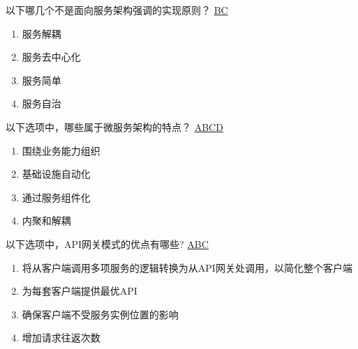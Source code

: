 \begin{problem}
	以下哪几个不是面向服务架构强调的实现原则？
	\uline{BC}    
    \vspace{-0.8em}
    \begin{multicols}{4}
        \begin{enumerate}[label=\Alph*.]
            \item 服务解耦
            \item 服务去中心化
            \item 服务简单
            \item 服务自治
        \end{enumerate}
    \end{multicols}
    \vspace{-1em}
\end{problem}



\begin{problem}
	‌以下选项中，哪些属于微服务架构的特点？
	\uline{ABCD}    
    \vspace{-0.8em}
    \begin{multicols}{4}
        \begin{enumerate}[label=\Alph*.]
            \item 围绕业务能力组织
            \item 基础设施自动化
            \item 通过服务组件化
            \item 内聚和解耦
        \end{enumerate}
    \end{multicols}
    \vspace{-1em}
\end{problem}



\begin{problem}
	以下选项中，API网关模式的优点有哪些?
	\uline{ABC}    
        \begin{enumerate}[label=\Alph*.]
            \item 将从客户端调用多项服务的逻辑转换为从API网关处调用，以简化整个客户端
            \item 为每套客户端提供最优API
            \item 确保客户端不受服务实例位置的影响
            \item 增加请求往返次数
        \end{enumerate}
\end{problem}



